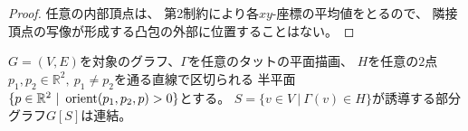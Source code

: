 \begin{proof}
任意の内部頂点は、
第2制約により各$xy$-座標の平均値をとるので、
隣接頂点の写像が形成する凸包の外部に位置することはない。
\end{proof}

\begin{lemma}
\label{lemma:tutte_connected}
$G=(V,E)$を対象のグラフ、$\Gamma$を任意のタットの平面描画、
$H$を任意の$2$点$p_1, p_2 \in \mathbb{R}^2,~ p_1\neq p_2$を通る直線で区切られる
半平面$\{p \in \mathbb{R}^2 ~|~ \operatorname{orient}(p_1, p_2, p) > 0\}$とする。
$S = \{v \in V~|~ \Gamma(v)\in H\}$が誘導する部分グラフ$G[S]$は連結。
\end{lemma}

